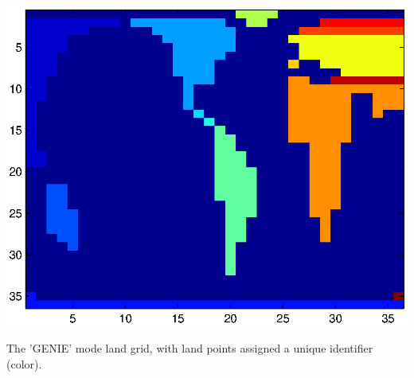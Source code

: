 \documentclass{tufte-book} %
\begin{document}
\begin{marginfigure}[0.0in]
\includegraphics[width=\linewidth]{ch3-genietopo4.eps}
\caption{The 'GENIE' mode land grid, with land points assigned a unique identifier (color).}
\label{fig:ch3-genietopo4}
\end{marginfigure}
\end{document}
